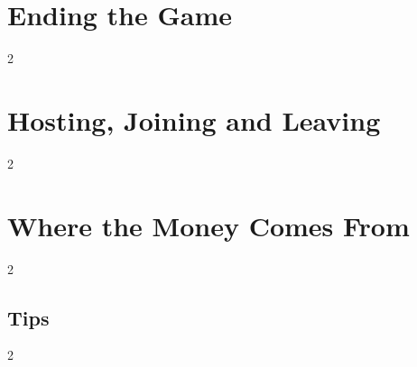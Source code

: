 \documentclass[12pt,letterpaper]{article}
\begin{document}
\renewcommand{\secstatus}{\MakeUppercase{\V{totalcompromise}} \quad // \quad \MakeUppercase{\V{lockdown}} \quad // \quad \MakeUppercase{\V{cashout}}}
\chapter{Ending the Game}
\begin{multicols}{2}
\end{multicols}

\renewcommand{\secstatus}{THE LOBBY \quad // \quad THE HOST \quad // \quad SEATS AND BOTS}
\chapter{Hosting, Joining and Leaving}
\begin{multicols}{2}
\end{multicols}

\renewcommand{\secstatus}{\MakeUppercase{\V{finderscut}} \quad // \quad \MakeUppercase{\V{root}} AND \MakeUppercase{\V{sudo}} \quad // \quad CASH}
\chapter{Where the Money Comes From}
\begin{multicols}{2}
\end{multicols}

\renewcommand{\secstatus}{EARLY \quad // \quad MIDDLE \quad // \quad LATE}
\vspace{24pt}\section{Tips}                  %
\begin{multicols}{2}
\end{multicols}

\renewcommand{\secstatus}{THE RULES \quad // \quad THE NES}
\end{document}
